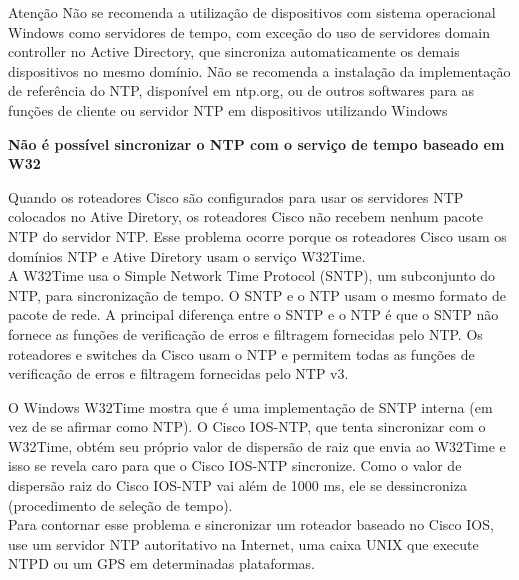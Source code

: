 \documentclass{if-beamer}
\begin{document}
	\begin{frame}[allowframebreaks]{Atenção}
	Não se recomenda a utilização de dispositivos com sistema operacional Windows como servidores de tempo, com exceção do uso de servidores domain controller no Active Directory, que sincroniza automaticamente os demais dispositivos no mesmo domínio. Não se recomenda a instalação da implementação de referência do NTP, disponível em ntp.org, ou de outros softwares para as funções de cliente ou servidor NTP em dispositivos utilizando Windows 
	\framebreak

	\textbf{Não é possível sincronizar o NTP com o serviço de tempo baseado em W32}

	Quando os roteadores Cisco são configurados para usar os servidores NTP colocados no Ative Diretory, os roteadores Cisco não recebem nenhum pacote NTP do servidor NTP. Esse problema ocorre porque os roteadores Cisco usam os domínios NTP e Ative Diretory usam o serviço W32Time.\\

	\framebreak
	A W32Time usa o Simple Network Time Protocol (SNTP), um subconjunto do NTP, para sincronização de tempo. O SNTP e o NTP usam o mesmo formato de pacote de rede. A principal diferença entre o SNTP e o NTP é que o SNTP não fornece as funções de verificação de erros e filtragem fornecidas pelo NTP. Os roteadores e switches da Cisco usam o NTP e permitem todas as funções de verificação de erros e filtragem fornecidas pelo NTP v3. \\

	\framebreak

	O Windows W32Time mostra que é uma implementação de SNTP interna (em vez de se afirmar como NTP). O Cisco IOS-NTP, que tenta sincronizar com o W32Time, obtém seu próprio valor de dispersão de raiz que envia ao W32Time e isso se revela caro para que o Cisco IOS-NTP sincronize. Como o valor de dispersão raiz do Cisco IOS-NTP vai além de 1000 ms, ele se dessincroniza (procedimento de seleção de tempo). \\

	\framebreak
	Para contornar esse problema e sincronizar um roteador baseado no Cisco IOS, use um servidor NTP autoritativo na Internet, uma caixa UNIX que execute NTPD ou um GPS em determinadas plataformas. \\
	\end{frame}
		
\end{document}
